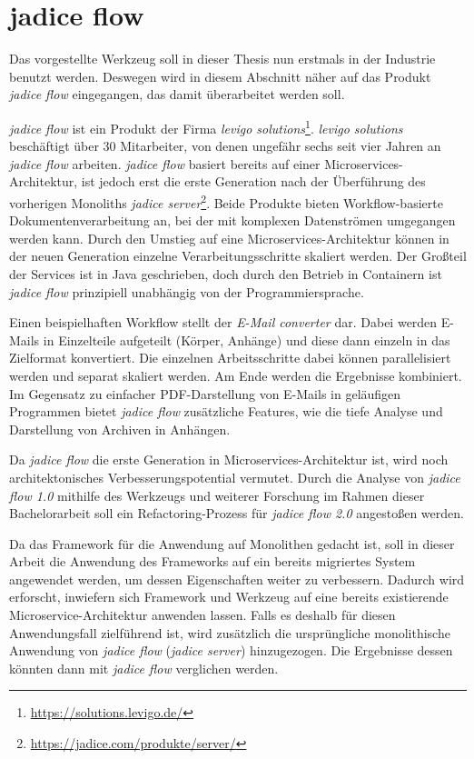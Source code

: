 \section{jadice flow}

Das vorgestellte Werkzeug soll in dieser Thesis nun erstmals in der Industrie benutzt werden.
Deswegen wird in diesem Abschnitt näher auf das Produkt \emph{jadice flow} eingegangen, das damit überarbeitet werden soll.

\emph{jadice flow} ist ein Produkt der Firma \emph{levigo solutions}\footnote{\url{https://solutions.levigo.de/}}.
\emph{levigo solutions} beschäftigt über 30 Mitarbeiter, von denen ungefähr sechs seit vier Jahren an \emph{jadice flow} arbeiten.
\emph{jadice flow} basiert bereits auf einer Microservices-Architektur, ist jedoch erst die erste Generation nach der Überführung des vorherigen Monoliths \emph{jadice server}\footnote{\url{https://jadice.com/produkte/server/}}.
Beide Produkte bieten Workflow-basierte Dokumentenverarbeitung an, bei der mit komplexen Datenströmen umgegangen werden kann.
Durch den Umstieg auf eine Microservices-Architektur können in der neuen Generation einzelne Verarbeitungsschritte skaliert werden.
Der Großteil der Services ist in Java geschrieben, doch durch den Betrieb in Containern ist \emph{jadice flow} prinzipiell unabhängig von der Programmiersprache.

Einen beispielhaften Workflow stellt der \emph{E-Mail converter} dar.
Dabei werden E-Mails in Einzelteile aufgeteilt (Körper, Anhänge) und diese dann einzeln in das Zielformat konvertiert.
Die einzelnen Arbeitsschritte dabei können parallelisiert werden und separat skaliert werden.
Am Ende werden die Ergebnisse kombiniert.
Im Gegensatz zu einfacher PDF-Darstellung von E-Mails in geläufigen Programmen bietet \emph{jadice flow} zusätzliche Features, wie die tiefe Analyse und Darstellung von Archiven in Anhängen.

Da \emph{jadice flow} die erste Generation in Microservices-Architektur ist, wird noch architektonisches Verbesserungspotential vermutet.
Durch die Analyse von \emph{jadice flow 1.0} mithilfe des Werkzeugs und weiterer Forschung im Rahmen dieser Bachelorarbeit soll ein Refactoring-Prozess für \emph{jadice flow 2.0} angestoßen werden.

Da das Framework für die Anwendung auf Monolithen gedacht ist, soll in dieser Arbeit die Anwendung des Frameworks auf ein bereits migriertes System angewendet werden, um dessen Eigenschaften weiter zu verbessern.
Dadurch wird erforscht, inwiefern sich Framework und Werkzeug auf eine bereits existierende Microservice-Architektur anwenden lassen.
Falls es deshalb für diesen Anwendungsfall zielführend ist, wird zusätzlich die ursprüngliche monolithische Anwendung von \emph{jadice flow} (\emph{jadice server}) hinzugezogen.
Die Ergebnisse dessen könnten dann mit \emph{jadice flow} verglichen werden.

